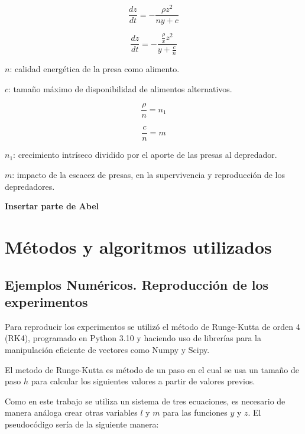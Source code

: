 \documentclass{wscpaperproc}
\theoremstyle{wsc}
\begin{document}
$$\frac{dz}{dt} =-\frac{\rho z^2}{n y+c}$$

$$\frac{dz}{dt} =-\frac{\frac{\rho}{x} z^2}{y+\frac{c}{n}}$$

$n$: calidad energética de la presa como alimento.

$c$: tamaño máximo de disponibilidad de alimentos alternativos.

\vspace*{0.5cm}

$$\frac{\rho}{n}=n_1$$

$$\frac{c}{n}=m$$

$n_1$: crecimiento intríseco dividido por el aporte de las presas al depredador.

$m$: impacto de la escacez de presas, en la supervivencia y reproducción de los depredadores.


\vspace*{3cm}

{\LARGE \bf *Insertar parte de Abel}

\vspace*{3cm}


\section*{Métodos y algoritmos utilizados}


\subsection*{Ejemplos Numéricos. Reproducción de los experimentos}

Para reproducir los experimentos se utilizó el método de Runge-Kutta de orden 4 (RK4), programado
en Python 3.10 y haciendo uso de librerías para la manipulación eficiente de vectores como Numpy y
Scipy.

El metodo de Runge-Kutta es método de un paso en el cual se usa un tamaño de paso $h$ para calcular
los siguientes valores a partir de valores previos.

Como en este trabajo se utiliza un sistema de tres ecuaciones,
es necesario de manera análoga crear otras variables $l$ y $m$ para
las funciones $y$ y $z$. El pseudocódigo sería de la siguiente manera:
\end{document}
